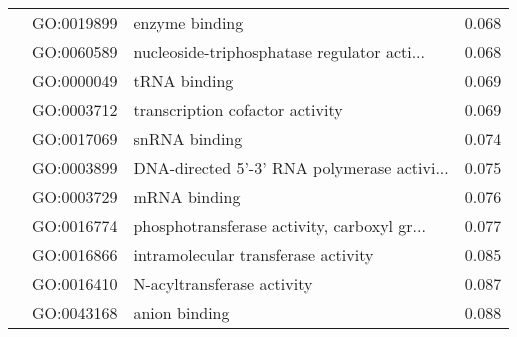\begin{longtable}{lllr}
   & GO:0019899 &                               enzyme binding &         0.068 \\
   & GO:0060589 &  nucleoside-triphosphatase regulator acti... &         0.068 \\
   & GO:0000049 &                                 tRNA binding &         0.069 \\
   & GO:0003712 &              transcription cofactor activity &         0.069 \\
   & GO:0017069 &                                snRNA binding &         0.074 \\
   & GO:0003899 &  DNA-directed 5'-3' RNA polymerase activi... &         0.075 \\
   & GO:0003729 &                                 mRNA binding &         0.076 \\
   & GO:0016774 &  phosphotransferase activity, carboxyl gr... &         0.077 \\
   & GO:0016866 &          intramolecular transferase activity &         0.085 \\
   & GO:0016410 &                   N-acyltransferase activity &         0.087 \\
   & GO:0043168 &                                anion binding &         0.088 \\
\end{longtable}
